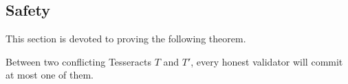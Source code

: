 

\subsection{Safety}
This section is devoted to proving the following theorem.

\begin{theorem}[Safety]\label{thm:safety}
    Between two conflicting Tesseracts $T$ and $T'$, every honest validator will commit at most one of them.
\end{theorem}

